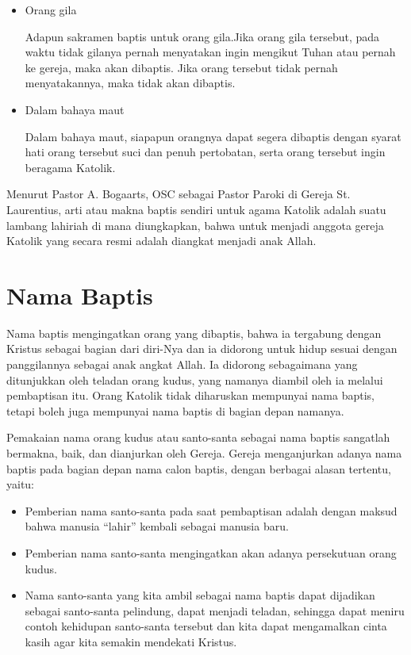 \begin{itemize}
		\item Orang gila
		
		Adapun sakramen baptis untuk orang gila.Jika orang gila tersebut, pada waktu tidak gilanya pernah menyatakan ingin mengikut Tuhan atau pernah ke gereja, maka akan dibaptis. Jika orang tersebut tidak pernah menyatakannya, maka tidak akan dibaptis.
		\item Dalam bahaya maut
		
		Dalam bahaya maut, siapapun orangnya dapat segera dibaptis dengan syarat hati orang tersebut suci dan penuh pertobatan, serta orang tersebut ingin beragama Katolik.
		
	\end{itemize} 
	Menurut Pastor A. Bogaarts, OSC sebagai Pastor Paroki di Gereja St. Laurentius, arti atau makna baptis sendiri untuk agama Katolik adalah suatu lambang lahiriah di mana diungkapkan, bahwa untuk menjadi anggota gereja Katolik yang secara resmi adalah diangkat menjadi anak Allah.
	
\section{Nama Baptis}
\label{sec:namabaptis1}
	
	Nama baptis mengingatkan orang yang dibaptis, bahwa ia tergabung dengan Kristus sebagai bagian dari diri-Nya dan ia didorong untuk hidup sesuai dengan panggilannya sebagai anak angkat Allah. Ia didorong sebagaimana yang ditunjukkan oleh teladan orang kudus, yang namanya diambil oleh ia melalui pembaptisan itu. Orang Katolik tidak diharuskan mempunyai nama baptis, tetapi boleh juga mempunyai nama baptis di bagian depan namanya.
	
	Pemakaian nama orang kudus atau santo-santa sebagai nama baptis sangatlah bermakna, baik, dan dianjurkan oleh Gereja. Gereja menganjurkan adanya nama baptis pada bagian depan nama calon baptis, dengan berbagai alasan tertentu, yaitu:
	
	\begin{itemize}
		\item Pemberian nama santo-santa pada saat pembaptisan adalah dengan maksud bahwa manusia ``lahir'' kembali sebagai manusia baru.
		\item Pemberian nama santo-santa mengingatkan akan adanya persekutuan orang kudus.
		\item Nama santo-santa yang kita ambil sebagai nama baptis dapat dijadikan sebagai santo-santa pelindung, dapat menjadi teladan, sehingga dapat meniru contoh kehidupan santo-santa tersebut dan kita dapat mengamalkan cinta kasih agar kita semakin mendekati Kristus.
	\end{itemize}
	
